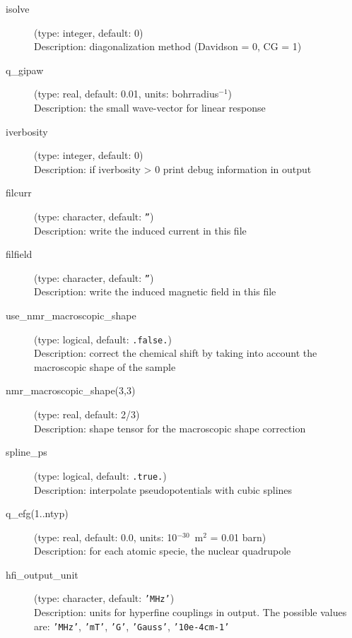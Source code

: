 \documentclass[a4paper,11pt,twoside]{article}
\begin{document}
\begin{description}
\item[isolve] (type: integer, default: 0)\\
Description: diagonalization method (Davidson = 0, CG = 1)

\item[q\_gipaw] (type: real, default: 0.01, units: bohrradius$^{-1}$)\\
Description: the small wave-vector for linear response

\item[iverbosity] (type: integer, default: 0)\\
Description: if iverbosity {\textgreater} 0 print debug information in output

\item[filcurr] (type: character, default: \texttt{''})\\
Description: write the induced current in this file

\item[filfield] (type: character, default: \texttt{''})\\
Description: write the induced magnetic field in this file

\item[use\_nmr\_macroscopic\_shape] (type: logical, default: \texttt{.false.})\\
Description: correct the chemical shift by taking into account the
macroscopic shape of the sample

\item[nmr\_macroscopic\_shape(3,3)] (type: real, default: 2/3)\\
Description: shape tensor for the macroscopic shape correction

\item[spline\_ps] (type: logical, default: \texttt{.true.})\\
Description: interpolate pseudopotentials with cubic splines

\item[q\_efg(1..ntyp)] (type: real, default: 0.0, units: 10$^{-30}$~m$^2$ = 0.01 barn)\\
Description: for each atomic specie, the nuclear quadrupole

\item[hfi\_output\_unit] (type: character, default: \texttt{'MHz'})\\
Description: units for hyperfine couplings in output. The possible values are: 
\texttt{'MHz'}, \texttt{'mT'}, \texttt{'G'}, \texttt{'Gauss'}, \texttt{'10e-4cm-1'}


\end{description}
\end{document}
